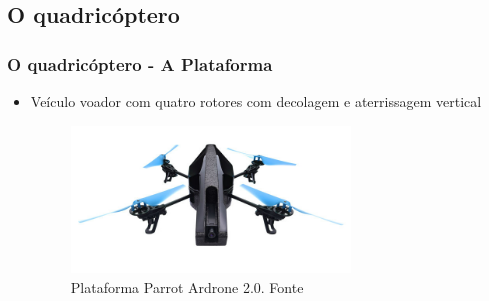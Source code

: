 \documentclass{beamer}
\begin{document}
\subsection{O quadricóptero}
\begin{frame}
  	
	\frametitle{O quadricóptero - A Plataforma}
	
	\begin{itemize}
	
	\item Veículo voador com quatro rotores com decolagem e aterrissagem vertical \cite{Salih2010}
		
	\begin{figure}
		\centering
		\includegraphics[keepaspectratio = true,
		width=0.7\textwidth]{img/parrot_drone.jpg}
		\caption{Plataforma Parrot Ardrone 2.0. Fonte \cite{ardrone}}
		\label{fig:quad}
	\end{figure}
		
	\end{itemize}
	
\end{frame}
\end{document}
